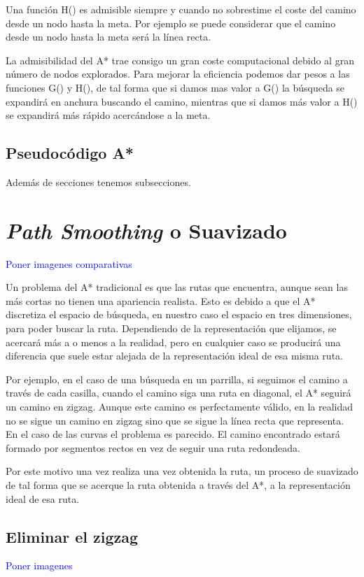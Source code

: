 Una función H() es admisible siempre y cuando no sobrestime el coste del camino desde un nodo hasta la meta. Por ejemplo se puede considerar que el camino desde un nodo hasta la meta será la línea recta.

La admisibilidad del A* trae consigo un gran coste computacional debido al gran número de nodos explorados. Para mejorar la eficiencia podemos dar pesos a las funciones G() y H(), de tal forma que si damos mas valor a G() la búsqueda se expandirá en anchura buscando el camino, mientras que si damos más valor a H() se expandirá más rápido acercándose a la meta.

\subsection{Pseudocódigo A*}

Además de secciones tenemos subsecciones.

\section{\textit{Path Smoothing} o Suavizado}
\textcolor{blue}{Poner imagenes comparativas}

Un problema del A* tradicional es que las rutas que encuentra, aunque sean las más cortas no tienen una apariencia realista. Esto es debido a que el A* discretiza el espacio de búsqueda, en nuestro caso el espacio en tres dimensiones, para poder buscar la ruta. Dependiendo de la representación que elijamos, se acercará más a o menos a la realidad, pero en cualquier caso se producirá una diferencia que suele estar alejada de la representación ideal de esa misma ruta.

Por ejemplo, en el caso de una búsqueda en un parrilla, si seguimos el camino a través de cada casilla, cuando el camino siga una ruta en diagonal, el A* seguirá un camino en zigzag. Aunque este camino es perfectamente válido, en la realidad no se sigue un camino en zigzag sino que se sigue la línea recta que representa. En el caso de las curvas el problema es parecido. El camino encontrado estará formado por segmentos rectos en vez de seguir una ruta redondeada.

Por este motivo una vez realiza una vez obtenida la ruta, un proceso de suavizado de tal forma que se acerque la ruta obtenida a través del A*, a la representación ideal de esa ruta.

\subsection{Eliminar el zigzag}
\textcolor{blue}{Poner imagenes}

